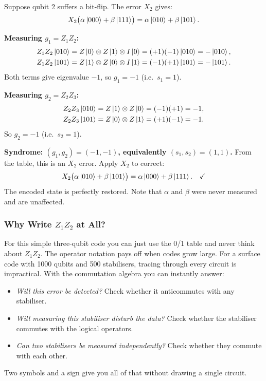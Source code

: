 \documentclass[11pt, a4paper]{article}
\theoremstyle{definition}
\theoremstyle{plain}
\theoremstyle{remark}
\begin{document}
\begin{workedexample}
Suppose qubit 2 suffers a bit-flip.  The error $X_2$ gives:
\[
  X_2\bigl(\alpha\ket{000}+\beta\ket{111}\bigr)
  = \alpha\ket{010} + \beta\ket{101}.
\]

\textbf{Measuring $g_1 = Z_1 Z_2$:}
\begin{align*}
  Z_1 Z_2 \ket{010} &= Z\ket{0} \otimes Z\ket{1} \otimes I\ket{0}
                    = (+1)(-1)\ket{010} = -\ket{010},\\
  Z_1 Z_2 \ket{101} &= Z\ket{1} \otimes Z\ket{0} \otimes I\ket{1}
                    = (-1)(+1)\ket{101} = -\ket{101}.
\end{align*}
Both terms give eigenvalue $-1$, so $g_1 = -1$ (i.e.\ $s_1 = 1$).

\textbf{Measuring $g_2 = Z_2 Z_3$:}
\begin{align*}
  Z_2 Z_3 \ket{010} &= Z\ket{1}\otimes Z\ket{0} = (-1)(+1) = -1,\\
  Z_2 Z_3 \ket{101} &= Z\ket{0}\otimes Z\ket{1} = (+1)(-1) = -1.
\end{align*}
So $g_2 = -1$ (i.e.\ $s_2 = 1$).

\textbf{Syndrome: $(g_1, g_2) = (-1,-1)$, equivalently $(s_1,s_2)=(1,1)$.}
From the table, this is an $X_2$ error.  Apply $X_2$ to correct:
\[
  X_2\bigl(\alpha\ket{010}+\beta\ket{101}\bigr)
  = \alpha\ket{000}+\beta\ket{111}. \quad\checkmark
\]
The encoded state is perfectly restored.
Note that $\alpha$ and $\beta$ were never measured and are unaffected.
\end{workedexample}

\subsubsection{Why Write $Z_1Z_2$ at All?}

For this simple three-qubit code you can just use the 0/1 table and
never think about $Z_1Z_2$.
The operator notation pays off when codes grow large.
For a surface code with 1000 qubits and 500 stabilisers, tracing through
every circuit is impractical.
With the commutation algebra you can instantly answer:
\begin{itemize}
  \item \emph{Will this error be detected?}
        Check whether it anticommutes with any stabiliser.
  \item \emph{Will measuring this stabiliser disturb the data?}
        Check whether the stabiliser commutes with the logical operators.
  \item \emph{Can two stabilisers be measured independently?}
        Check whether they commute with each other.
\end{itemize}
Two symbols and a sign give you all of that without drawing a single
circuit.
\end{document}
